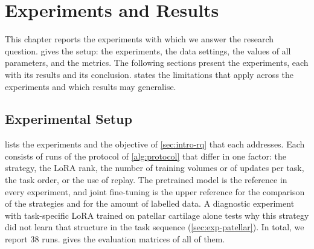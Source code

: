 %

\chapter{Experiments and Results}
\label{chap:experiments}

This chapter reports the experiments with which we answer the research question.
 gives the setup: the experiments, the data settings, the values of all parameters, and the metrics.
The following sections present the experiments, each with its results and its conclusion.
 states the limitations that apply across the experiments and which results may generalise.

\section{Experimental Setup}
\label{sec:exp-setup}

 lists the experiments and the objective of \cref{sec:intro-rq} that each addresses.
Each consists of runs of the protocol of \cref{alg:protocol} that differ in one factor: the strategy, the LoRA rank, the number of training volumes or of updates per task, the task order, or the use of replay.
The pretrained model is the reference in every experiment, and joint fine-tuning is the upper reference for the comparison of the strategies and for the amount of labelled data.
A diagnostic experiment with task-specific LoRA trained on patellar cartilage alone tests why this strategy did not learn that structure in the task sequence (\cref{sec:exp-patellar}).
In total, we report 38 runs.
 gives the evaluation matrices of all of them.

